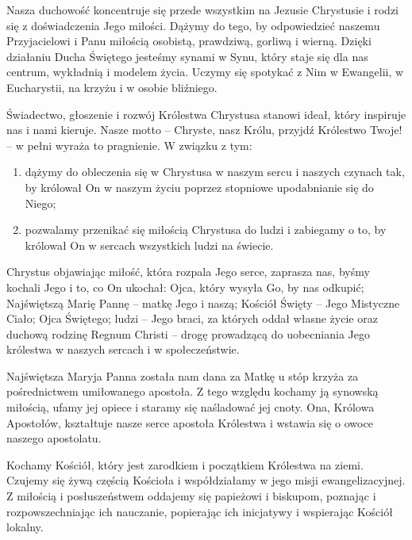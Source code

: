 \filbreak 
{}
 
 Nasza duchowość koncentruje się przede wszystkim na Jezusie Chrystusie i rodzi się z doświadczenia Jego miłości. Dążymy do tego, by odpowiedzieć naszemu Przyjacielowi i Panu miłością osobistą, prawdziwą, gorliwą i wierną. Dzięki działaniu Ducha Świętego jesteśmy synami w Synu, który staje się dla nas centrum, wykładnią i modelem życia. Uczymy się spotykać z Nim w Ewangelii, w Eucharystii, na krzyżu i w osobie bliźniego.
 
 
 {Ś}wiadectwo, głoszenie i rozwój Królestwa Chrystusa stanowi ideał, który inspiruje nas i nami kieruje. Nasze motto – Chryste, nasz Królu, przyjdź Królestwo Twoje! – w pełni wyraża to pragnienie. W związku z tym:


\begin{enumerate}


\item dążymy do obleczenia się w Chrystusa w naszym sercu i naszych czynach tak, by królował On w naszym życiu poprzez stopniowe upodabnianie się do Niego;


\item pozwalamy przenikać się miłością Chrystusa do ludzi i zabiegamy o to, by królował On w sercach wszystkich ludzi na świecie.


\end{enumerate}


 
 Chrystus objawiając miłość, która rozpala Jego serce, zaprasza nas, byśmy kochali Jego i to, co On ukochał: Ojca, który wysyła Go, by nas odkupić; Najświętszą Marię Pannę – matkę Jego i naszą; Kościół Święty – Jego Mistyczne Ciało; Ojca Świętego; ludzi – Jego braci, za których oddał własne życie oraz duchową rodzinę Regnum Christi – drogę prowadzącą do uobecniania Jego królestwa w naszych sercach i w społeczeństwie.
 
 
 Najświętsza Maryja Panna została nam dana za Matkę u stóp krzyża za pośrednictwem umiłowanego apostoła. Z tego względu kochamy ją synowską miłością, ufamy jej opiece i staramy się naśladować jej cnoty. Ona, Królowa Apostołów, kształtuje nasze serce apostoła Królestwa i wstawia się o owoce naszego apostolatu.
 
 
 Kochamy Kościół, który jest zarodkiem i początkiem Królestwa na ziemi. Czujemy się żywą częścią Kościoła i współdziałamy w jego misji ewangelizacyjnej. Z miłością i posłuszeństwem oddajemy się papieżowi i biskupom, poznając i rozpowszechniając ich nauczanie, popierając ich inicjatywy i wspierając Kościół lokalny.



